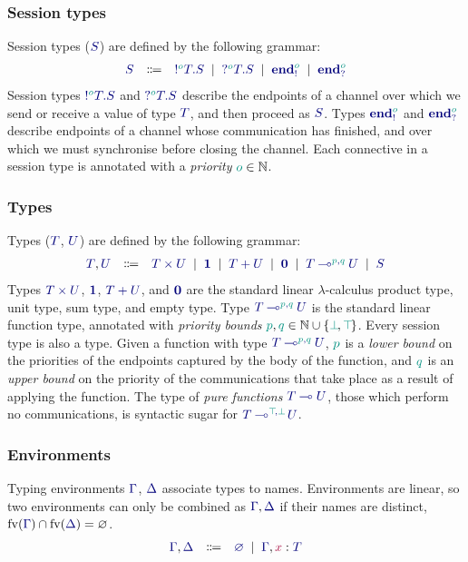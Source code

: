 \documentclass[main.tex]{subfiles}
\begin{document}
\subsubsection*{Session types}
Session types ($\ty{S}$) are defined by the following grammar:
\[
\begin{array}{lcl}
  \ty{S}
  & \Coloneqq & \ty{\tysend[\cs{o}]{T}{S}}
    \sep        \ty{\tyrecv[\cs{o}]{T}{S}}
    \sep        \ty{\tyends[\cs{o}]}
    \sep        \ty{\tyendr[\cs{o}]}
\end{array}
\]
Session types $\ty{\tysend[\cs{o}]{T}{S}}$ and $\ty{\tyrecv[\cs{o}]{T}{S}}$ describe the endpoints of a channel over which we send or receive a value of type $\ty{T}$, and then proceed as $\ty{S}$. Types $\ty{\tyends[\cs{o}]}$ and $\ty{\tyendr[\cs{o}]}$ describe endpoints of a channel whose communication has finished, and over which we must synchronise before closing the channel. Each connective in a session type is annotated with a \emph{priority} $\cs{o}\in\mathbb{N}$.

\subsubsection*{Types}
Types ($\ty{T}$, $\ty{U}$) are defined by the following grammar:
\[
\begin{array}{lcl}
  \ty{T}, \ty{U}
  & \Coloneqq & \ty{\typrod{T}{U}}
    \sep        \ty{\tyunit}
    \sep        \ty{\tysum{T}{U}}
    \sep        \ty{\tyvoid}
    \sep        \ty{\tylolli[\cs{p},\cs{q}]{T}{U}}
    \sep        \ty{S}
\end{array}
\]
Types $\ty{\typrod{T}{U}}$, $\ty{\tyunit}$, $\ty{\tysum{T}{U}}$, and $\ty{\tyvoid}$ are the standard linear $\lambda$-calculus product type, unit type, sum type, and empty type.
Type $\ty{\tylolli[\cs{p},\cs{q}]{T}{U}}$ is the standard linear function type, annotated with \emph{priority bounds} $\cs{p},\cs{q}\in\mathbb{N}\cup\{\cs{\pbot},\cs{\ptop}\}$.
Every session type is also a type.
Given a function with type $\ty{\tylolli[\cs{p},\cs{q}]{T}{U}}$, $\cs{p}$ is a \emph{lower bound} on the priorities of the endpoints captured by the body of the function, and $\cs{q}$ is an \emph{upper bound} on the priority of the communications that take place as a result of applying the function. The type of \emph{pure functions} $\ty{\tylolli{T}{U}}$, \ie those which perform no communications, is syntactic sugar for $\ty{\tylolli[\cs{\ptop},\cs{\pbot}]{T}{U}}$.

\subsubsection*{Environments}
Typing environments $\ty{\Gamma}$, $\ty{\Delta}$ associate types to names. Environments are linear, so two environments can only be combined as $\ty{\Gamma}, \ty{\Delta}$ if their names are distinct, \ie $\fv(\ty{\Gamma})\cap\fv(\ty{\Delta})=\varnothing$.
\[
\begin{array}{lcl}
  \ty{\Gamma}, \ty{\Delta}
  & \Coloneqq & \ty{\emptyenv}
    \sep        \ty{\Gamma}, \tmty{x}{T}
\end{array}
\]
\end{document}

